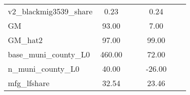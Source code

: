 \begin{table}[htbp]
\begin{tabular}{l*{2}{ccc}}
v2\_blackmig3539\_share&        0.23&            &            &        0.24&            &            \\
GM                  &       93.00&            &            &        7.00&            &            \\
GM\_hat2             &       97.00&            &            &       99.00&            &            \\
base\_muni\_county\_L0 &      460.00&            &            &       72.00&            &            \\
n\_muni\_county\_L0    &       40.00&            &            &      -26.00&            &            \\
mfg\_lfshare         &       32.54&            &            &       23.46&            &            \\
\bottomrule
\end{tabular}
\end{table}
